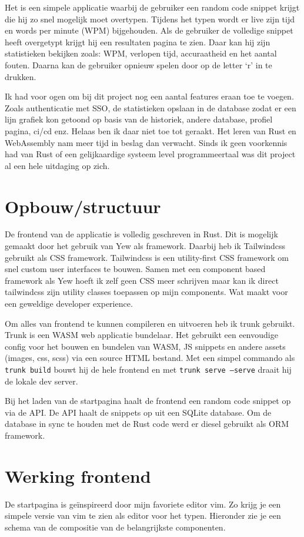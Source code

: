Het is een simpele applicatie waarbij de gebruiker een random code snippet krijgt die hij zo snel
mogelijk moet overtypen. Tijdens het typen wordt er live zijn tijd en words per minute (WPM)
bijgehouden. Als de gebruiker de volledige snippet heeft overgetypt krijgt hij een resultaten pagina
te zien. Daar kan hij zijn statistieken bekijken zoals: WPM, verlopen tijd, accuraatheid en het
aantal fouten. Daarna kan de gebruiker opnieuw spelen door op de letter ‘r’ in te drukken. 

Ik had voor ogen om bij dit project nog een aantal features eraan toe te voegen. Zoals authenticatie
met SSO, de statistieken opslaan in de database zodat er een lijn grafiek kon getoond op basis van
de historiek, andere database, profiel pagina, ci/cd enz. Helaas ben ik daar niet toe tot geraakt.
Het leren van Rust en WebAssembly nam meer tijd in beslag dan verwacht. Sinds ik geen voorkennis had
van Rust of een gelijkaardige systeem level programmeertaal was dit project al een hele uitdaging op
zich.

\section{Opbouw/structuur}

De frontend van de applicatie is volledig geschreven in Rust. Dit is mogelijk gemaakt door het
gebruik van Yew als framework. Daarbij heb ik Tailwindcss gebruikt als CSS framework. Tailwindcss is
een utility-first CSS framework om snel custom user interfaces te bouwen. Samen met een component
based framework als Yew hoeft ik zelf geen CSS meer schrijven maar kan ik direct tailwindcss zijn
utility classes toepassen op mijn components. Wat maakt voor een geweldige developer experience. 

Om alles van frontend te kunnen compileren en uitvoeren heb ik trunk gebruikt. Trunk is een WASM web
applicatie bundelaar. Het gebruikt een eenvoudige config voor het bouwen en bundelen van WASM, JS
snippets en andere assets (images, css, scss) via een source HTML bestand. Met een simpel commando
als \texttt{trunk build} bouwt hij de hele frontend en met \texttt{trunk serve
--serve} draait hij de lokale dev server.  

Bij het laden van de startpagina haalt de frontend een random code snippet op via de API. De API
haalt de snippets op uit een SQLite database. Om de database in sync te houden met de Rust code werd
er diesel gebruikt als ORM framework.


\section{Werking frontend}
De startpagina is geïnspireerd door mijn favoriete editor vim. Zo krijg je een simpele versie van
vim te zien als editor voor het typen. Hieronder zie je een schema van de compositie van de
belangrijkste componenten.

